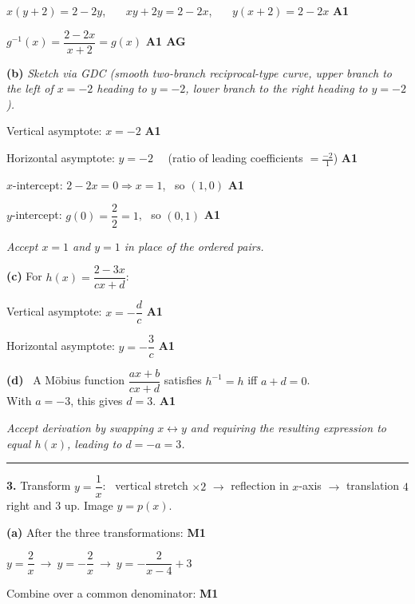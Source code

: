 \documentclass[12pt, twoside]{article}
\begin{document}
$x(y+2)=2-2y$, \ \ \ $xy+2y=2-2x$, \ \ \ $y(x+2)=2-2x$ \hfill \textbf{A1}

$g^{-1}(x)=\dfrac{2-2x}{x+2}=g(x)$ \hfill \textbf{A1 AG}

\medskip

\textbf{(b)} \emph{Sketch via GDC (smooth two-branch reciprocal-type curve,
upper branch to the left of $x=-2$ heading to $y=-2$, lower branch to the right
heading to $y=-2$).}

Vertical asymptote: $x=-2$ \hfill \textbf{A1}

Horizontal asymptote: $y=-2$
\ \ (ratio of leading coefficients $=\tfrac{-2}{1}$) \hfill \textbf{A1}

$x$-intercept: $2-2x=0 \Rightarrow x=1$, \ so $(1,0)$ \hfill \textbf{A1}

$y$-intercept: $g(0)=\dfrac{2}{2}=1$, \ so $(0,1)$ \hfill \textbf{A1}

\emph{Accept $x=1$ and $y=1$ in place of the ordered pairs.}

\medskip

\textbf{(c)} For $h(x)=\dfrac{2-3x}{cx+d}$:

Vertical asymptote: $x=-\dfrac{d}{c}$ \hfill \textbf{A1}

Horizontal asymptote: $y=-\dfrac{3}{c}$ \hfill \textbf{A1}

\medskip

\textbf{(d)} \ A M\"obius function $\dfrac{ax+b}{cx+d}$ satisfies
$h^{-1}=h$ iff $a+d=0$. \\
With $a=-3$, this gives $d=3$. \hfill \textbf{A1}

\emph{Accept derivation by swapping $x\leftrightarrow y$ and requiring the
resulting expression to equal $h(x)$, leading to $d=-a=3$.}

\bigskip\hrule\bigskip

\noindent\textbf{3.} Transform $y=\dfrac{1}{x}$: \ vertical stretch $\times 2$ $\rightarrow$
reflection in $x$-axis $\rightarrow$ translation $4$ right and $3$ up. Image $y=p(x)$.

\medskip

\textbf{(a)} After the three transformations: \hfill \textbf{M1}

$\displaystyle y=\dfrac{2}{x}\ \to\ y=-\dfrac{2}{x}\ \to\ y=-\dfrac{2}{x-4}+3$

Combine over a common denominator: \hfill \textbf{M1}
\end{document}
